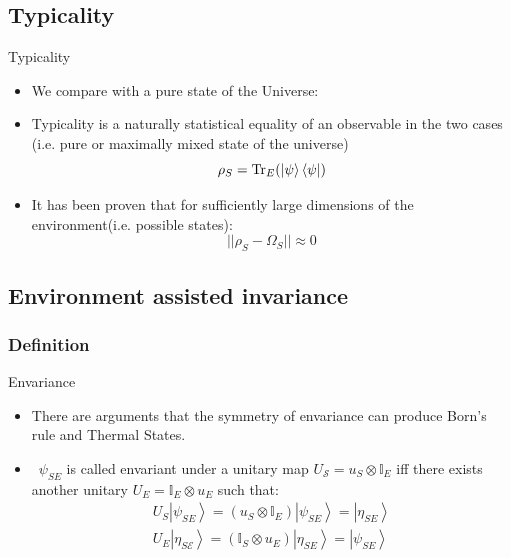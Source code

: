 \documentclass[handout]{beamer}
\begin{document}
\subsection{Typicality}
\begin{frame}{Typicality}
\begin{itemize}
\item We compare with a pure state of the Universe:
\item Typicality is a naturally statistical equality of an observable in the two cases (i.e. pure or maximally mixed state of the universe)
\begin{equation}
\rho_{S}= \operatorname{Tr}_{E}(\ket{\psi}\bra{\psi})
\end{equation}
\item It has been proven that for sufficiently large 
dimensions of the environment(i.e. possible states):
\begin{equation}
||\rho_S-\Omega_S||\approx 0
\end{equation}

\end{itemize}

\end{frame}
\subsection{Environment assisted invariance}
\subsubsection{Definition}
\begin{frame}{Envariance}
\begin{itemize}
\item There are arguments that the symmetry of envariance can produce Born's rule and Thermal States.
\item \ $\psi_{SE}$ is called envariant under a unitary map $U_{\mathcal{S}}=u_{S} \otimes \mathbb{I}_{E}$ iff there exists another unitary $U_{E}= \mathbb{I}_{E} \otimes u_{E} $ such that:
\begin{equation}
\begin{array}{l}
U_{S}\left|\psi_{S E}\right\rangle=\left(u_{S} \otimes \mathbb{I}_{E}\right)\left|\psi_{S E}\right\rangle=\left|\eta_{S E}\right\rangle \\
U_{E}\left|\eta_{S \mathcal{E}}\right\rangle=\left(\mathbb{I}_{S} \otimes u_{E}\right)\left|\eta_{S E}\right\rangle=\left|\psi_{S E}\right\rangle
\end{array}
\end{equation}
\end{itemize}
\end{frame}
\end{document}
